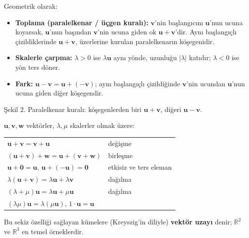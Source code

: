 Geometrik olarak:
\begin{itemize}
\item \textbf{Toplama (paralelkenar / üçgen kuralı):} $\mathbf v$'nin başlangıcını $\mathbf u$'nun ucuna koyarsak, $\mathbf u$'nun başından $\mathbf v$'nin ucuna giden ok $\mathbf u+\mathbf v$'dir. Aynı başlangıçlı çizildiklerinde $\mathbf u+\mathbf v$, üzerlerine kurulan paralelkenarın köşegenidir.
\item \textbf{Skalerle çarpma:} $\lambda>0$ ise $\lambda\mathbf u$ aynı yönde, uzunluğu $|\lambda|$ katıdır; $\lambda<0$ ise yön ters döner.
\item \textbf{Fark:} $\mathbf u-\mathbf v=\mathbf u+(-\mathbf v)$; aynı başlangıçlı çizildiğinde $\mathbf v$'nin ucundan $\mathbf u$'nun ucuna giden diğer köşegendir.
\end{itemize}

\begin{center}

{\small Şekil 2. Paralelkenar kuralı: köşegenlerden biri $\mathbf u+\mathbf v$, diğeri $\mathbf u-\mathbf v$.}
\end{center}

\begin{teorem}
$\mathbf u,\mathbf v,\mathbf w$ vektörler, $\lambda,\mu$ skalerler olmak üzere:
\begin{center}
\begin{tabular}{l l}
\toprule
$\mathbf u+\mathbf v=\mathbf v+\mathbf u$ & değişme \\
$(\mathbf u+\mathbf v)+\mathbf w=\mathbf u+(\mathbf v+\mathbf w)$ & birleşme \\
$\mathbf u+\mathbf 0=\mathbf u$, \quad $\mathbf u+(-\mathbf u)=\mathbf 0$ & etkisiz ve ters eleman \\
$\lambda(\mathbf u+\mathbf v)=\lambda\mathbf u+\lambda\mathbf v$ & dağılma \\
$(\lambda+\mu)\mathbf u=\lambda\mathbf u+\mu\mathbf u$ & dağılma \\
$(\lambda\mu)\mathbf u=\lambda(\mu\mathbf u)$, \quad $1\cdot\mathbf u=\mathbf u$ & \\
\bottomrule
\end{tabular}
\end{center}
Bu sekiz özelliği sağlayan kümelere (Kreyszig'in diliyle) \textbf{vektör uzayı} denir; $\mathbb R^2$ ve $\mathbb R^3$ en temel örneklerdir.
\end{teorem}

